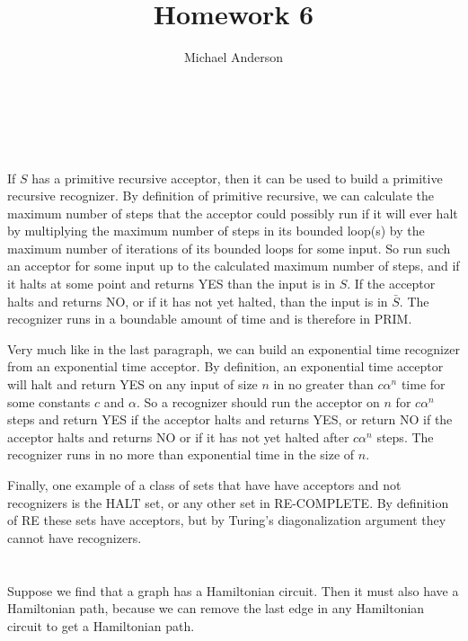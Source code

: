 \documentclass{article}
\author{Michael Anderson}
\title{Homework 6}
\begin{document}
\maketitle
{}
\\
\flushleft
\newpage

\section{}
If $S$ has a primitive recursive acceptor, then it can be used to build a
primitive recursive recognizer. By definition of primitive recursive, we can
calculate the maximum number of steps that the acceptor could possibly run if it
will ever halt by
multiplying the maximum number of steps in its bounded loop(s) by the maximum
number of iterations of its bounded loops for some input. So run such an
acceptor for some input up to the calculated maximum number of steps, and if it 
halts at some point and returns YES than the input is in $S$. If the acceptor
halts and returns NO, or if it has not yet halted, than the input is in
$\bar S$. The recognizer runs in a boundable amount of time and is therefore in
PRIM.

\vspace{1em}

Very much like in the last paragraph, we can build an exponential time
recognizer from an exponential time acceptor. By definition, an exponential time
acceptor will halt and return YES on any input of size $n$ in no greater than $c\alpha^n$ time for some constants $c$ and $\alpha$. So a recognizer should run 
the acceptor on $n$ for $c\alpha^n$ steps and return YES if the acceptor
halts and returns
YES, or return NO if the acceptor halts and returns NO or if it has not yet
halted after $c\alpha^n$ steps. The recognizer runs in no more than exponential
time in the size of $n$.

\vspace{1em}

Finally, one example of a class of sets that have have acceptors and not
recognizers is the HALT set, or any other set in RE-COMPLETE. By definition of
RE these sets have acceptors, but by Turing's diagonalization argument they
cannot have recognizers.

\section{}
Suppose we find that a graph has a Hamiltonian circuit. Then it must also have a
Hamiltonian path, because we can remove the last edge in any Hamiltonian circuit
to get a Hamiltonian path.
\end{document}
